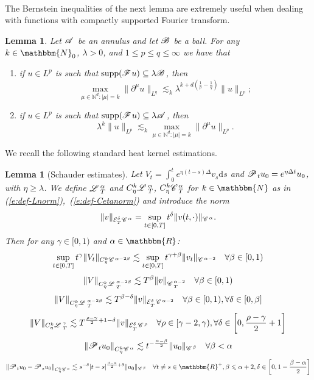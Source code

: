 \documentclass[11pt,reqno]{amsart}
\newcommand{\cdummy}{\cdot}
\newcommand{\mathd}{\mathrm{d}}
\newcommand{\tmop}[1]{\ensuremath{\operatorname{#1}}}
\newenvironment{enumeratenumeric}{\begin{enumerate}[1.] }{\end{enumerate}}
\newtheorem{lemma}[theorem]{Lemma}
\newcommand{\CC}{\mathscr{C} \hspace{.1em}}
\newcommand{\CF}{\mathscr{F} \hspace{.1em}}
\newcommand{\CB}{\mathscr{B} \hspace{.1em}}
\newcommand{\CA}{\mathscr{A} \hspace{.1em}}
\newcommand{\LL}{\mathscr{L} \hspace{.2em}}
\newcommand{\PP}{\mathscr{P} \hspace{.1em}}
\begin{document}
\

The Bernstein inequalities of the next lemma are extremely useful when
dealing with functions with compactly supported Fourier transform.

\begin{lemma}
  \label{lemma:Bernstein}Let $\CA$ be an annulus and let $\CB$ be a ball. For
  any $k \in \mathbbm{N}_0$, $\lambda > 0$, and $1 \leqslant p \leqslant q
  \leqslant \infty$ we have that
  \begin{enumeratenumeric}
    \item if $u \in L^p$ is such that $\tmop{supp} (\CF u) \subseteq \lambda
    \CB$, then
    \[ \max_{\mu \in \mathbb{N}^d : | \mu | = k} \| \partial^{\mu} u\|_{L^q}
       \lesssim_k \lambda^{k + d \left( \frac{1}{p} - \frac{1}{q} \right)}
       \|u\|_{L^p} ; \]
    \item if $u \in L^p$ is such that $\tmop{supp} (\CF u) \subseteq \lambda
    \CA$, then
    \[ \lambda^k \|u\|_{L^p} \lesssim_k \max_{\mu \in \mathbb{N}^d : | \mu | =
       k} \| \partial^{\mu} u\|_{L^p} . \]
  \end{enumeratenumeric}
\end{lemma}

We recall the following standard heat kernel estimations.

\begin{lemma}[Schauder estimates]
  \label{l:schauder}Let $V_t = \int_0^t e^{\eta (t - s) \Delta} v_s \mathd s$
  and $\PP_t u_0 = e^{\eta \Delta t} u_0$, with $\eta \geqslant \lambda$. We
  define $\LL^{\alpha}_T$ and $C_{\eta}^k \LL^{\alpha}_T$, $C_{\eta}^k
  \CC^{\alpha}_T$ for $k \in \mathbbm{N}$ as in
  (\ref{e:def-Lnorm}),~(\ref{e:def-Cetanorm}) and introduce the norm
  \[ \| v \|_{\mathcal{E}^{\delta}_T \CC^{\alpha}} = \sup_{t \in [0, T]}
     t^{\delta} \| v (t, \cdummy) \|_{\CC^{\alpha}} . \]
  Then for any $\gamma \in [0, 1)$ and $\alpha \in \mathbbm{R}$:
  \[ \sup_{t \in [0, T]} t^{\gamma} \| V_t \|_{C_{\eta}^k \CC^{\alpha - 2
     \beta}} \lesssim \sup_{t \in [0, T]} t^{\gamma + \beta} \| v_t
     \|_{\CC^{\alpha - 2}} \quad \forall \beta \in [0, 1) \]
  \[ \| V \|_{C_{\eta}^k \LL^{\alpha - 2 \beta}_T} \lesssim T^{\beta} \| v
     \|_{\CC^{\alpha - 2}_T} \quad \forall \beta \in [0, 1) \]
  \[ \| V \|_{C_{\eta}^k \LL_T^{\alpha - 2 \beta}} \lesssim T^{\beta - \delta}
     \| v \|_{\mathcal{E}^{\delta}_{_T} \CC^{\alpha - 2}} \quad \forall \beta
     \in [0, 1), \forall \delta \in [0, \beta] \]
  \[ \| V \|_{C_{\eta}^k \LL_T^{\gamma}} \lesssim T^{\frac{\rho - \gamma}{2} +
     1 - \delta} \| v \|_{\mathcal{E}^{\delta}_{_T} \CC^{\rho}} \quad \forall
     \rho \in [\gamma - 2, \gamma), \forall \delta \in \left[ 0, \frac{\rho -
     \gamma}{2} + 1 \right] \]
  \[ \left\| \PP_t u_0 \right\|_{C_{\eta}^k \CC^{\alpha}} \lesssim t^{-
     \frac{\alpha - \beta}{2}} \| u_0 \|_{\CC^{\beta}} \quad \forall \beta <
     \alpha \]
  \[ \left\| \PP_t u_0 - \PP_s u_0 \right\|_{C_{\eta}^k \CC^{\alpha}} \lesssim
     s^{- \delta} | t - s |^{\frac{\beta - \alpha}{2} + \delta} \| u_0
     \|_{\CC^{\beta}_{}} \quad \forall t \neq s \in \mathbbm{R}^+, \beta
     \leqslant \alpha + 2, \delta \in \left[ 0, 1 - \frac{\beta - \alpha}{2}
     \right] \]
\end{lemma}
\end{document}
